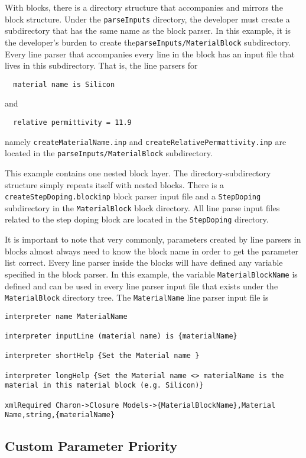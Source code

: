 With blocks, there is a directory structure that accompanies and
mirrors the block structure.  Under the \texttt{parseInputs}
directory, the developer must create a subdirectory that has the same
name as the block parser.  In this example, it is the developer's
burden to create the\texttt{parseInputs/MaterialBlock} subdirectory.
Every line parser that accompanies every line in the block has an
input file that lives in this subdirectory.  That is, the line parsers
for
\begin{lstlisting}
  material name is Silicon
\end{lstlisting}
and 
\begin{lstlisting}
  relative permittivity = 11.9
\end{lstlisting}
namely \texttt{createMaterialName.inp} and
\texttt{createRelativePermattivity.inp} are located in the
\texttt{parseInputs/MaterialBlock} subdirectory.

This example contains one nested block layer.  The
directory-subdirectory structure simply repeats itself with nested
blocks.  There is a \texttt{createStepDoping.blockinp} block parser
input file and a \texttt{StepDoping} subdirectory in the
\texttt{MaterialBlock} block directory.  All line parse input files
related to the step doping block are located in the
\texttt{StepDoping} directory.

It is important to note that very commonly, parameters created by line
parsers in blocks almost always need to know the block name in order
to get the parameter list correct.  Every line parser inside the
blocks will have defined any variable specified in the block parser.
In this example, the variable \texttt{MaterialBlockName} is defined
and can be used in every line parser input file that exists under the
\texttt{MaterialBlock} directory tree.  The \texttt{MaterialName} line
parser input file is
\begin{lstlisting}
interpreter name MaterialName

interpreter inputLine (material name) is {materialName}

interpreter shortHelp {Set the Material name }

interpreter longHelp {Set the Material name <> materialName is the material in this material block (e.g. Silicon)}

xmlRequired Charon->Closure Models->{MaterialBlockName},Material Name,string,{materialName}
\end{lstlisting}

\subsection{Custom Parameter Priority}

